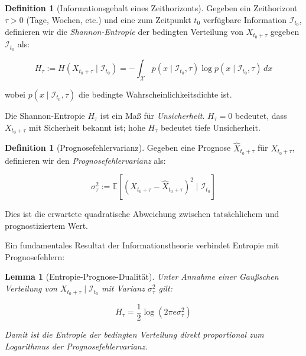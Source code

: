 \documentclass[12pt, a4paper, titlepage]{report}
\newtheorem{lemma}[theorem]{Lemma}
\theoremstyle{definition}
\newtheorem{definition}[theorem]{Definition}
\theoremstyle{remark}
\newcommand{\E}{\mathbb{E}}
\begin{document}
\begin{definition}[Informationsgehalt eines Zeithorizonts]
Gegeben ein Zeithorizont $\tau > 0$ (Tage, Wochen, etc.) und eine zum Zeitpunkt $t_0$ verfügbare Information $\mathcal{I}_{t_0}$, definieren wir die \emph{Shannon-Entropie} der bedingten Verteilung von $X_{t_0+\tau}$ gegeben $\mathcal{I}_{t_0}$ als:

\begin{equation}
H_\tau := H(X_{t_0+\tau} \mid \mathcal{I}_{t_0}) = -\int_{\mathcal{X}} p(x \mid \mathcal{I}_{t_0}, \tau) \log p(x \mid \mathcal{I}_{t_0}, \tau) \, dx
\label{eq:entropy}
\end{equation}

wobei $p(x \mid \mathcal{I}_{t_0}, \tau)$ die bedingte Wahrscheinlichkeitsdichte ist.
\end{definition}

Die Shannon-Entropie $H_\tau$ ist ein Maß für \emph{Unsicherheit}. $H_\tau = 0$ bedeutet, dass $X_{t_0+\tau}$ mit Sicherheit bekannt ist; hohe $H_\tau$ bedeutet tiefe Unsicherheit.

\begin{definition}[Prognosefehlervarianz]
Gegeben eine Prognose $\hat{X}_{t_0+\tau}$ für $X_{t_0+\tau}$, definieren wir den \emph{Prognosefehlervarianz} als:

\begin{equation}
\sigma_\tau^2 := \E\left[ \left( X_{t_0+\tau} - \hat{X}_{t_0+\tau} \right)^2 \mid \mathcal{I}_{t_0} \right]
\label{eq:mse}
\end{equation}

Dies ist die erwartete quadratische Abweichung zwischen tatsächlichem und prognostiziertem Wert.
\end{definition}

Ein fundamentales Resultat der Informationstheorie verbindet Entropie mit Prognosefehlern:

\begin{lemma}[Entropie-Prognose-Dualität]
Unter Annahme einer Gaußschen Verteilung von $X_{t_0+\tau} \mid \mathcal{I}_{t_0}$ mit Varianz $\sigma_\tau^2$ gilt:

\begin{equation}
H_\tau = \frac{1}{2} \log(2\pi e \sigma_\tau^2)
\label{eq:entropie_varianz}
\end{equation}

Damit ist die Entropie der bedingten Verteilung direkt proportional zum Logarithmus der Prognosefehlervarianz.
\end{lemma}
\end{document}
